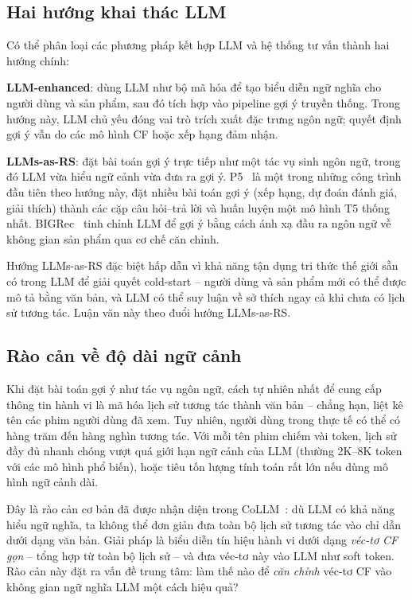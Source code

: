 \subsection{Hai hướng khai thác LLM}
\label{ssec:hai-huong}

Có thể phân loại các phương pháp kết hợp LLM và hệ thống tư vấn thành hai hướng chính:

\textbf{LLM-enhanced}: dùng LLM như bộ mã hóa để tạo biểu diễn ngữ nghĩa cho người
dùng và sản phẩm, sau đó tích hợp vào pipeline gợi ý truyền thống. Trong hướng này, LLM
chủ yếu đóng vai trò trích xuất đặc trưng ngôn ngữ; quyết định gợi ý vẫn do các mô hình
CF hoặc xếp hạng đảm nhận.

\textbf{LLMs-as-RS}: đặt bài toán gợi ý trực tiếp như một tác vụ sinh ngôn ngữ, trong
đó LLM vừa hiểu ngữ cảnh vừa đưa ra gợi ý. P5~\cite{p52022} là một trong những công
trình đầu tiên theo hướng này, đặt nhiều bài toán gợi ý (xếp hạng, dự đoán đánh giá,
giải thích) thành các cặp câu hỏi--trả lời và huấn luyện một mô hình T5 thống nhất.
BIGRec~\cite{bigrec2023} tinh chỉnh LLM để gợi ý bằng cách ánh xạ đầu ra ngôn ngữ về
không gian sản phẩm qua cơ chế căn chỉnh.

Hướng LLMs-as-RS đặc biệt hấp dẫn vì khả năng tận dụng tri thức thế giới sẵn có trong
LLM để giải quyết cold-start -- người dùng và sản phẩm mới có thể được mô tả bằng văn
bản, và LLM có thể suy luận về sở thích ngay cả khi chưa có lịch sử tương tác. Luận văn
này theo đuổi hướng LLMs-as-RS.

\subsection{Rào cản về độ dài ngữ cảnh}
\label{ssec:rao-can-context}

Khi đặt bài toán gợi ý như tác vụ ngôn ngữ, cách tự nhiên nhất để cung cấp thông tin
hành vi là mã hóa lịch sử tương tác thành văn bản -- chẳng hạn, liệt kê tên các phim
người dùng đã xem. Tuy nhiên, người dùng trong thực tế có thể có hàng trăm đến hàng
nghìn tương tác. Với mỗi tên phim chiếm vài token, lịch sử đầy đủ nhanh chóng vượt quá
giới hạn ngữ cảnh của LLM (thường 2K--8K token với các mô hình phổ biến), hoặc tiêu tốn
lượng tính toán rất lớn nếu dùng mô hình ngữ cảnh dài.

Đây là rào cản cơ bản đã được nhận diện trong CoLLM~\cite{collm2023}: dù LLM có khả
năng hiểu ngữ nghĩa, ta không thể đơn giản đưa toàn bộ lịch sử tương tác vào chỉ dẫn
dưới dạng văn bản. Giải pháp là biểu diễn tín hiệu hành vi dưới dạng \textit{véc-tơ CF
gọn} -- tổng hợp từ toàn bộ lịch sử -- và đưa véc-tơ này vào LLM như soft token.
Rào cản này đặt ra vấn đề trung tâm: làm thế nào để \textit{căn chỉnh} véc-tơ CF vào
không gian ngữ nghĩa LLM một cách hiệu quả?


